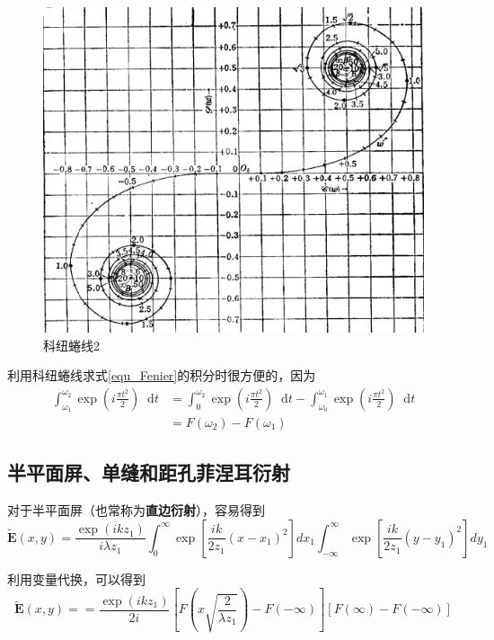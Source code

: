 \documentclass[UTF8]{ctexart}
\newcommand*{\dif}{\mathop{}\!\mathrm{d}}
\begin{document}
\newpage
\begin{figure}[htp]
	\centering
	\includegraphics[width=12cm]{Diffraction_quanxian1.png}
	\caption{科纽蜷线2}
	\label{figure_quanxian2}
\end{figure}

	利用科纽蜷线求式\ref{equ_Fenier}的积分时很方便的，因为
	\begin{equation}
	\begin{aligned}
		\int_{\omega_{1}}^{\omega_{2}} \exp \left(i \frac{\pi t^{2}}{2}\right) \dif t &= \int_{0}^{\omega_{2}} \exp \left(i \frac{\pi t^{2}}{2}\right) \dif t - \int_{\omega_{0}}^{\omega_{1}} \exp \left(i \frac{\pi t^{2}}{2}\right) \dif t
		\\
		&= F(\omega_{2}) - F(\omega_{1})
	\end{aligned}
	\end{equation}
	
	\subsection{半平面屏、单缝和距孔菲涅耳衍射}
	对于半平面屏（也常称为\textbf{直边衍射}），容易得到
	\begin{equation}
	\tilde{\boldsymbol{E}}(x, y)=\frac{\exp \left(i k z_{1}\right)}{i \lambda z_{1}} \int_{0}^{\infty} \exp \left[\frac{i k}{2 z_{1}}\left(x-x_{1}\right)^{2}\right] d x_{1} \int_{-\infty}^{\infty} \exp \left[\frac{i k}{2 z_{1}}\left(y-y_{1}\right)^{2}\right] d y_{1}
	\end{equation}
	
\noindent 利用变量代换，可以得到
\begin{equation}
	\tilde{\boldsymbol{E}} (x,y) = =\frac{\exp \left(i k z_{1}\right)}{2 i}\left[F\left(x \sqrt{\frac{2}{\lambda z_{1}}}\right)-F(-\infty)\right][F(\infty)-F(-\infty)]
\end{equation}
\end{document}
